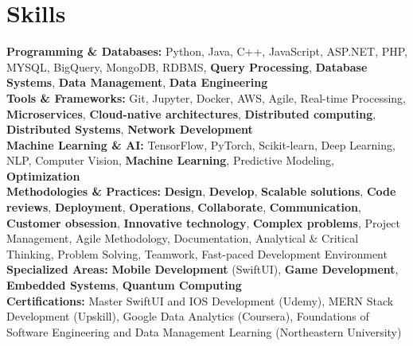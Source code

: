 \documentclass[a4paper,10pt]{article}
\begin{document}
\section*{Skills}
\textbf{Programming \& Databases: } Python, Java, C++, JavaScript, ASP.NET, PHP, MYSQL, BigQuery, MongoDB, RDBMS, \textbf{Query Processing}, \textbf{Database Systems}, \textbf{Data Management}, \textbf{Data Engineering} \\
\textbf{Tools \& Frameworks:} Git, Jupyter, Docker, AWS, Agile, Real-time Processing, \textbf{Microservices}, \textbf{Cloud-native architectures}, \textbf{Distributed computing}, \textbf{Distributed Systems}, \textbf{Network Development} \\
\textbf{Machine Learning \& AI: } TensorFlow, PyTorch, Scikit-learn, Deep Learning, NLP, Computer Vision, \textbf{Machine Learning}, Predictive Modeling, \textbf{Optimization} \\
\textbf{Methodologies \& Practices:} \textbf{Design}, \textbf{Develop}, \textbf{Scalable solutions}, \textbf{Code reviews}, \textbf{Deployment}, \textbf{Operations}, \textbf{Collaborate}, \textbf{Communication}, \textbf{Customer obsession}, \textbf{Innovative technology}, \textbf{Complex problems}, Project Management, Agile Methodology, Documentation, Analytical \& Critical Thinking, Problem Solving, Teamwork, Fast-paced Development Environment \\
\textbf{Specialized Areas:} \textbf{Mobile Development} (SwiftUI), \textbf{Game Development}, \textbf{Embedded Systems}, \textbf{Quantum Computing} \\
\textbf{Certifications:} Master SwiftUI and IOS Development (Udemy), MERN Stack Development (Upskill), Google Data Analytics (Coursera), Foundations of Software Engineering and Data Management Learning (Northeastern University) \\

\vspace{-4mm}
\end{document}
